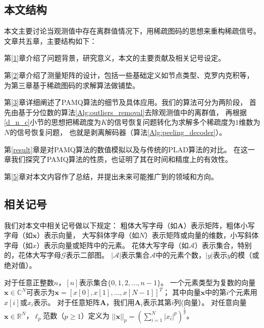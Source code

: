 \documentclass[AutoFakeBold]{LZUThesis}
\begin{document}
\subsection{本文结构}

本文主要讨论当观测值中存在离群值情况下，用稀疏图码的思想来重构稀疏信号。文章共五章，主要结构如下：

第\ref{1}章介绍了问题背景，研究意义，本文的主要贡献及相关记号设定。

第\ref{2}章介绍了测量矩阵的设计，包括一些基础定义如节点类型、克罗内克积等，为第三章基于稀疏图码的求解算法做铺垫。

第\ref{3}章详细阐述了PAMQ算法的细节及具体应用。我们的算法可分为两阶段，
首先由基于分位数的算法\ref{Alg:outliers_removal}去除观测值中的离群值，
再根据\ref{d_n_c}小节的思想把稀疏度为$K$的信号恢复问题转化为求解多个稀疏度为$1$维数为$N$的信号恢复问题，
也就是剥离解码器（算法\ref{Alg:peeling_decoder}）。

第\ref{result}章是对PAMQ算法的数值模拟以及与传统的PLAD算法的对比。
在这一章我们探究了PAMQ算法的性质，也证明了其在时间和精度上的有效性。

第\ref{5}章对本文内容作了总结，并提出未来可能推广到的领域和方向。

\subsection{相关记号}

我们对本文中相关记号做以下规定：
粗体大写字母（如$\mathbf{A}$）表示矩阵，粗体小写字母（如$\mathbf{x}$）表示向量，
大写斜体字母（如$N$）表示矩阵或向量的维数，小写斜体字母（如$x$）表示向量或矩阵中的元素。
花体大写字母（如$\mathcal{A}$）表示集合，特别的，花体大写字母$\mathcal{G}$表示二部图。
$|\mathcal{A}|$表示集合$\mathcal{A}$中的元素个数，$|y|$表示$y$的模（或绝对值）。

对于任意正整数$n$，$[n]$表示集合$\{0, 1, 2, \dots, n-1\}$。
一个元素类型为复数的向量$\mathbf{x} \in \mathbb{C}^{N}$可表示为$\mathbf{x} = [x[0], x[1], \dots, x[N-1]]^T$；
其中向量$\mathbf{x}$中的第$i$个元素用$x[i]$或$x_i$表示。
对于任意矩阵$\mathbf{A}$，我们用$\mathbf{A}_i$表示其第$i$列(向量）。
对任意向量$\mathbf{x} \in \mathbb{R}^N$，$\ell_p$范数（$p \geq 1$）定义为
$||\mathbf{x}||_p = (\sum_{i=1}^N |x_i|^p)^{\frac{1}{p}}$。


\end{document}
